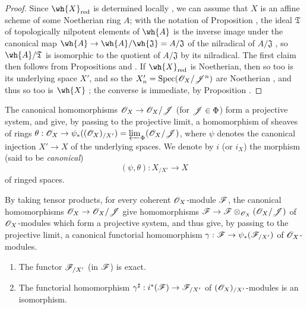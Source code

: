 \begin{proof}
\label{proof-1.10.8.6}
Since $\wh{X}_\red$ is determined locally , we can assume that $X$ is an affine scheme of some Noetherian ring $A$; with the notation of Proposition , the ideal $\mathfrak{T}$ of topologically nilpotent elements of $\wh{A}$ is the inverse image under the canonical map $\wh{A}\to\wh{A}/\wh{\mathfrak{J}}=A/\mathfrak{J}$ of the nilradical of $A/\mathfrak{J}$ , so $\wh{A}/\mathfrak{T}$ is isomorphic to the quotient of $A/\mathfrak{J}$ by its nilradical.
The first claim then follows from Propositions  and .
If $\wh{X}_\red$ is Noetherian, then so too is its underlying space $X'$, and so the $X_n'=\operatorname{Spec}(\mathscr{O}_X/\mathscr{J}^n)$ are Noetherian , and thus so too is $\wh{X}$ ; the converse is immediate, by Proposition .
\end{proof}

\begin{env}[10.8.7]
\label{1.10.8.7}
The canonical homomorphisms $\sh{O}_X\to\sh{O}_X/\sh{J}$ (for $\mathscr{J}\in\Phi$) form a projective system, and give, by passing to the projective limit, a homomorphism of sheaves of rings $\theta:\sh{O}_X\to\psi_*((\sh{O}_X)_{/X'})=\varprojlim_\Phi(\sh{O}_X/\sh{J})$, where $\psi$ denotes the canonical injection $X'\to X$ of the underlying spaces.
We denote by $i$ (or $i_X$) the morphism (said to be \emph{canonical})
\[
  (\psi,\theta):X_{/X'}\to X
\]
of ringed spaces.

By taking tensor products, for every coherent $\mathscr{O}_X$-module $\mathscr{F}$, the canonical homomorphisms $\sh{O}_X\to\sh{O}_X/\sh{J}$ give homomorphisms $\sh{F}\to\sh{F}\otimes_{\sh{O}_X}(\sh{O}_X/\sh{J})$ of $\mathscr{O}_X$-modules which form a projective system, and thus give, by passing to the projective limit, a canonical functorial homomorphism $\gamma:\sh{F}\to\psi_*(\sh{F}_{/X'})$ of $\mathscr{O}_X$-modules.
\end{env}

\begin{proposition}[10.8.8]
\label{1.10.8.8}
\medskip\noindent
\begin{enumerate}[label=\emph{(\roman*)}]
  \item The functor $\mathscr{F}_{/X'}$ (in $\mathscr{F}$) is exact.
  \item The functorial homomorphism $\gamma^\sharp:i^*(\sh{F})\to\sh{F}_{/X'}$ of $(\mathscr{O}_X)_{/X'}$-modules is an isomorphism.
\end{enumerate}
\end{proposition}

